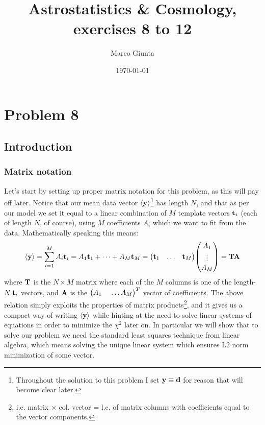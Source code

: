 \documentclass[a4paper]{article}
\title{Astrostatistics \& Cosmology, exercises 8 to 12}%
\author{Marco Giunta}
\date{\today}
\newcommand{\mat}[1]{\vb{#1}}
\begin{document}
\maketitle
\tableofcontents

\section{Problem 8}
\subsection{Introduction}
\subsubsection{Matrix notation}
Let's start by setting up proper matrix notation for this problem, as this will pay off later. Notice that our mean data vector $\expval{\vb{y}}$\footnote{Throughout the solution to this problem I set $\vb{y} \equiv \vb{d}$ for reason that will become clear later.} has length $N$, and that as per our model we set it equal to a linear combination of $M$ template vectors $\vb{t}_i$ (each of length $N$, of course), using $M$ coefficients $A_i$ which we want to fit from the data. Mathematically speaking this means:
\begin{equation}
\label{eq:notazione_matriciale}
    \expval{\vb{y}} = \sum_{i=1}^M A_i \vb{t}_i = A_1\vb{t}_1+\dots+A_M\vb{t}_M = \mqty(\vb{t}_1 & \dots & \vb{t}_M)\mqty(A_1\\ \vdots\\ A_M) = \mat{T}\vb{A}
\end{equation}
where $\mat{T}$ is the $N\times M$ matrix where each of the $M$ columns is one of the length-$N$ $\vb{t}_i$ vectors, and $\vb{A}$ is the $\mqty(A_1\ & \dots A_M)^T$ vector of coefficients. The above relation simply exploits the properties of matrix products\footnote{i.e. matrix $\times$ col. vector = l.c. of matrix columns with coefficients equal to the vector components.}, and it gives us a compact way of writing $\expval{\vb{y}}$ while hinting at the need to solve linear systems of equations in order to minimize the $\chi^2$ later on. 
In particular we will show that to solve our problem we need the standard least squares technique from linear algebra, which means solving the unique linear system which ensures L2 norm minimization of some vector.
\end{document}
